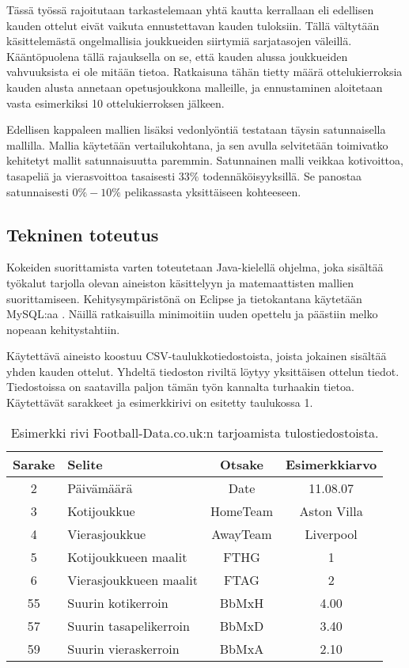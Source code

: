 \documentclass[a4paper,finnish,titlepage,12pt]{article}
\begin{document}
Tässä työssä rajoitutaan tarkastelemaan yhtä kautta kerrallaan eli edellisen kauden ottelut eivät vaikuta ennustettavan kauden tuloksiin. Tällä vältytään käsittelemästä ongelmallisia joukkueiden siirtymiä sarjatasojen väleillä. Kääntöpuolena tällä rajauksella on se, että kauden alussa joukkueiden vahvuuksista ei ole mitään tietoa. Ratkaisuna tähän tietty määrä ottelukierroksia kauden alusta annetaan opetusjoukkona malleille, ja ennustaminen aloitetaan vasta esimerkiksi 10 ottelukierroksen jälkeen.

Edellisen kappaleen mallien lisäksi vedonlyöntiä testataan täysin satunnaisella mallilla.
Mallia käytetään vertailukohtana, ja sen avulla selvitetään toimivatko kehitetyt mallit satunnaisuutta paremmin.
Satunnainen malli veikkaa kotivoittoa, tasapeliä ja vierasvoittoa tasaisesti $33 \%$ todennäköisyyksillä.
Se panostaa satunnaisesti $0 \% - 10 \%$ pelikassasta yksittäiseen kohteeseen.



\subsection{Tekninen toteutus}
Kokeiden suorittamista varten toteutetaan Java-kielellä ohjelma, joka sisältää työkalut tarjolla olevan aineiston käsittelyyn ja matemaattisten mallien suorittamiseen. Kehitysympäristönä on Eclipse \cite{eclipse} ja tietokantana käytetään MySQL:aa \cite{mysql}. Näillä ratkaisuilla minimoitiin uuden opettelu ja päästiin melko nopeaan kehitystahtiin. 

Käytettävä aineisto koostuu CSV-taulukkotiedostoista, joista jokainen sisältää yhden kauden ottelut. Yhdeltä tiedoston riviltä löytyy yksittäisen ottelun tiedot. Tiedostoissa on saatavilla paljon tämän työn kannalta turhaakin tietoa. Käytettävät sarakkeet ja esimerkkirivi on esitetty taulukossa 1.

\begin{table}[h!]
    \caption{Esimerkki rivi Football-Data.co.uk:n tarjoamista tulostiedostoista.}
    \begin{center}
    \begin{tabular}{c|l|c|c}
        \hline
	Sarake & Selite & Otsake & Esimerkkiarvo \\ \hline
	2 & Päivämäärä & Date & 11.08.07 \\
	3 & Kotijoukkue & HomeTeam & Aston Villa \\
	4 & Vierasjoukkue & AwayTeam & Liverpool \\
	5 & Kotijoukkueen maalit & FTHG & 1 \\
	6 & Vierasjoukkueen maalit & FTAG & 2 \\
	55 & Suurin kotikerroin & BbMxH & 4.00 \\
	57 & Suurin tasapelikerroin & BbMxD & 3.40 \\
	59 & Suurin vieraskerroin & BbMxA & 2.10 \\
        \hline
    \end{tabular}
    \end{center}
\end{table}
\end{document}
